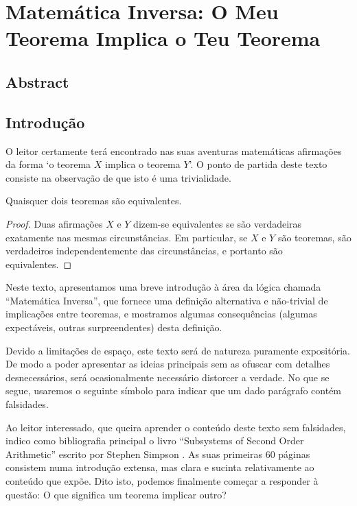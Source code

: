 
\chapter{Matemática Inversa: O Meu Teorema Implica o Teu Teorema}

\section*{Abstract}



\section*{Introdução}

O leitor certamente terá encontrado nas suas aventuras matemáticas afirmações da forma `o teorema $X$ implica o teorema $Y$'. O ponto de partida deste texto consiste na observação de que isto é uma trivialidade.

\begin{theorem}
Quaisquer dois teoremas são equivalentes.
\end{theorem}

\begin{proof}
Duas afirmações $X$ e $Y$ dizem-se equivalentes se são verdadeiras exatamente nas mesmas circunstâncias. Em particular, se $X$ e $Y$ são teoremas, são verdadeiros independentemente das circunstâncias, e portanto são equivalentes.
\end{proof}

Neste texto, apresentamos uma breve introdução à área da lógica chamada ``Matemática Inversa'', que fornece uma definição alternativa e não-trivial de implicações entre teoremas, e mostramos algumas consequências (algumas expectáveis, outras surpreendentes) desta definição.

Devido a limitações de espaço, este texto será de natureza puramente expositória. De modo a poder apresentar as ideias principais sem as ofuscar com detalhes desnecessários, será ocasionalmente necessário distorcer a verdade. No que se segue, usaremos o seguinte símbolo para indicar que um dado parágrafo contém falsidades. 


Ao leitor interessado, que queira aprender o conteúdo deste texto sem falsidades, indico como bibliografia principal o livro ``Subsystems of Second Order Arithmetic'' escrito por Stephen Simpson \cite{simpson}. As suas primeiras 60 páginas consistem numa introdução extensa, mas clara e sucinta relativamente ao conteúdo que expõe. Dito isto, podemos finalmente começar a responder à questão: O que significa um teorema implicar outro?

